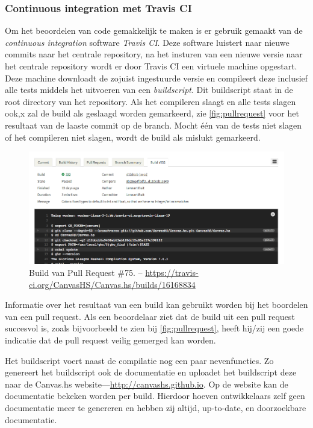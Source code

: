 \subsubsection{Continuous integration met Travis CI}
Om het beoordelen van code gemakkelijk te maken is er gebruik gemaakt van de \emph{continuous integration} software \emph{Travis CI}. Deze software luistert naar nieuwe commits naar het centrale repository, na het insturen van een nieuwe versie naar het centrale repository wordt er door Travis CI een virtuele machine opgestart. Deze machine downloadt de zojuist ingestuurde versie en compileert deze inclusief alle tests middels het uitvoeren van een \emph{buildscript}. Dit buildscript staat in de root directory van het repository. Als het compileren slaagt en alle tests slagen ook,x zal de build als geslaagd worden gemarkeerd, zie \autoref{fig:pullrequest} voor het resultaat van de laaste commit op de  branch. Mocht één van de tests niet slagen of het compileren niet slagen, wordt de build als mislukt gemarkeerd.

\begin{figure}[H]
\begin{center}
\includegraphics[keepaspectratio,width=\textwidth]{./images/travis.png}
\caption{Build van Pull Request \#75. – \url{https://travis-ci.org/CanvasHS/Canvas.hs/builds/16168834}}
\label{fig:travis}
\end{center}
\end{figure}

Informatie over het resultaat van een build kan gebruikt worden bij het boordelen van een pull request. Als een beoordelaar ziet dat de build uit een pull request succesvol is, zoals bijvoorbeeld te zien bij \autoref{fig:pullrequest}, heeft hij/zij een goede indicatie dat de pull request veilig gemerged kan worden.

Het buildscript voert naast de compilatie nog een paar nevenfuncties. Zo genereert het buildscript ook de documentatie en uploadet het buildscript deze naar de Canvas.hs website—\url{http://canvashs.github.io}. Op de website kan de documentatie bekeken worden per build. Hierdoor hoeven ontwikkelaars zelf geen documentatie meer te genereren en hebben zij altijd, up-to-date, en doorzoekbare documentatie.

